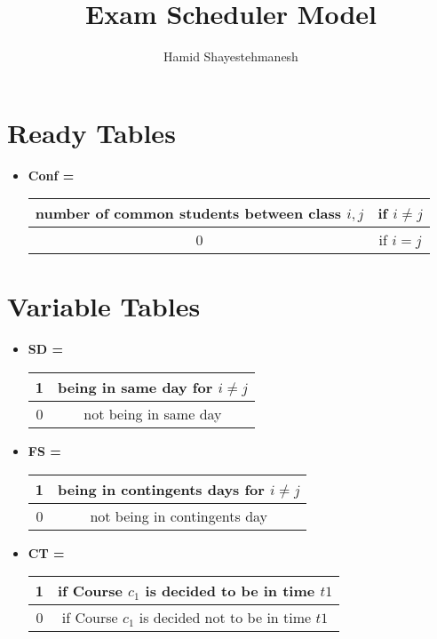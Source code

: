 \documentclass{report}
\begin{document}
\author{Hamid Shayestehmanesh}
\title{Exam Scheduler Model}
\maketitle
\newpage

\section{Ready Tables}
\begin{itemize}
\item
{\textbf{Conf \big[ C \big]\big[ C \big]  \space =} \begin{tabular}{| c | c |} \hline
number of common students between class $i, j$ & if $i \neq j$ \\ \hline
0 & if $i = j$ \\ \hline
\end{tabular}}
\end{itemize}

\section{Variable Tables}

\begin{itemize}
\item
{\textbf{SD \big[ C \big]\big[ C \big]  \space =}
\begin{tabular}{| c | c |} \hline
1 & being in same day for $i \neq j$ \\ \hline
0 & not being in same day \\ \hline
\end{tabular}}

\item{
\textbf{FS \big[ C \big]\big[ C \big]  \space =}
\begin{tabular}{| c | c |} \hline
1 & being in contingents days for $i \neq j$ \\ \hline
0 & not being in contingents day \\ \hline
\end{tabular}}

\item{
\textbf{CT \big[ C \big]\big[ T \big]  \space =}
\begin{tabular}{| c | c |} \hline
1 & if Course $c_1$ is decided to be in time $t1$  \\ \hline
0 & if Course $c_1$ is decided not to be in time $t1$ \\ \hline
\end{tabular}}


\end{itemize}
\end{document}
